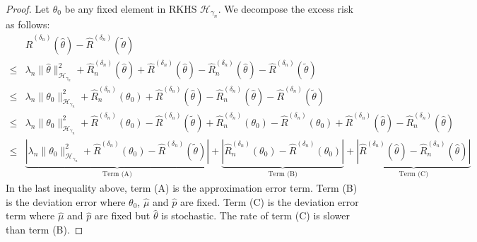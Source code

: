 \begin{proof}

Let $\theta_0$ be any fixed element in RKHS $\mathcal{H}_{\gamma_n}$. We decompose the excess risk as follows:
    \begin{align*}
   &\widehat R^{({\delta_n})}(\widehat\theta) - \widehat R^{({\delta_n})}(\tilde\theta)\\
   \leq & \lambda_n\|\widehat\theta\|^2_{\mathcal{H}_{\gamma_n}}+ \widehat R_n^{({\delta_n})}(\widehat\theta)+\widehat R^{({\delta_n})}(\widehat\theta)  - \widehat R_n^{({\delta_n})}(\widehat\theta) - \widehat R^{({\delta_n})}(\tilde\theta)\\
   \leq & \lambda_n\|\theta_0\|^2_{\mathcal{H}_{\gamma_n}}  + \widehat R_n^{({\delta_n})}(\theta_0)+ \widehat R^{({\delta_n})}(\widehat\theta) - \widehat R_n^{({\delta_n})}(\widehat\theta) - \widehat R^{({\delta_n})}(\tilde\theta)\\
   \leq & \lambda_n\|\theta_0\|^2_{\mathcal{H}_{\gamma_n}}+\widehat R^{({\delta_n})}(\theta_0) -\widehat R^{({\delta_n})}(\tilde\theta) + \widehat R_n^{({\delta_n})}(\theta_0) - \widehat R^{({\delta_n})}(\theta_0) +
   \widehat R^{({\delta_n})}(\widehat\theta)
     -\widehat R_n^{({\delta_n})}(\widehat\theta) \\
   \leq & \underbrace{\left|\lambda_n\|\theta_0\|^2_{\mathcal{H}_{\gamma_n}}+\widehat R^{({\delta_n})}(\theta_0) -\widehat R^{({\delta_n})}(\tilde\theta)\right|}_{\text{Term (A)}} + \underbrace{\left|\widehat R_n^{({\delta_n})}(\theta_0) - \widehat R^{({\delta_n})}(\theta_0)\right|}_{\text{Term (B)}} + \underbrace{
   \left|\widehat R^{({\delta_n})}(\widehat\theta)
     -\widehat R_n^{({\delta_n})}(\widehat\theta)\right|}_{\text{Term  (C)}}
\end{align*}
In the last inequality above, term (A) is the approximation error term. Term (B) is the deviation error where $\theta_0$, $\widehat \mu$ and $\widehat p$ are fixed. Term (C) is the deviation error term where $\widehat \mu$ and $\widehat p$ are fixed but $\widehat\theta$ is stochastic. The rate of term (C) is slower than term (B).



\end{proof}
